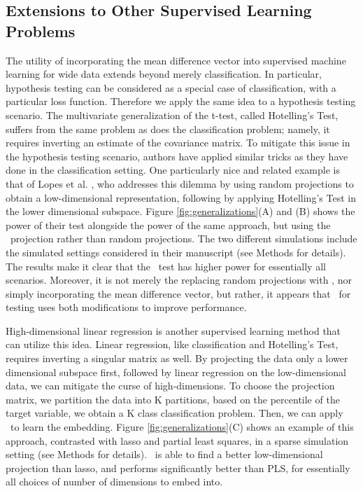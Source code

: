 \documentclass[10pt]{article}
\begin{document}
\subsection*{Extensions to Other Supervised Learning Problems}

The utility of incorporating the mean difference vector into supervised machine learning for wide data extends beyond merely classification.  In particular, hypothesis testing can be considered as a special case of classification, with a particular loss function.  Therefore we apply the same idea to a hypothesis testing scenario.  The multivariate generalization of the t-test, called Hotelling's Test, suffers from the same problem as does the classification problem; namely, it requires inverting an estimate of the covariance matrix. To mitigate this issue in the hypothesis testing scenario, authors have applied similar tricks as they have done in the classification setting. One particularly nice and related example is that of  Lopes et al. \cite{Lopes2011a}, who addresses this dilemma by using random projections to obtain a low-dimensional representation, following by applying Hotelling's Test in the lower dimensional subspace.  Figure \ref{fig:generalizations}(A) and (B) shows the power of their test alongside the power of the same approach, but using the \Lol~projection rather than random projections.  The two different simulations include the simulated settings considered in their manuscript (see Methods for details).  The results make it clear that the \Lol~test has higher power for essentially all scenarios.  Moreover, it is not merely the replacing random projections with \Pca, nor simply incorporating the mean difference vector, but rather, it appears that \Lol~for testing uses both modifications to improve performance.

High-dimensional linear regression is another supervised learning method that can utilize this idea. Linear regression, like classification and Hotelling's Test, requires inverting a singular matrix as well.  By projecting the data only a lower dimensional subspace first, followed by linear regression on the low-dimensional data, we can mitigate the curse of high-dimensions.  To choose the projection matrix, we partition the data into K partitions, based on the percentile of the target variable, we obtain a K class classification problem.  Then, we can apply \Lol~to learn the embedding.  Figure \ref{fig:generalizations}(C) shows an example of this approach, contrasted with lasso and partial least squares, in a sparse simulation setting (see Methods for details). \Lol~is able to find a better low-dimensional projection than lasso, and performs significantly better than PLS, for essentially all choices of number of dimensions to embed into.
\end{document}
